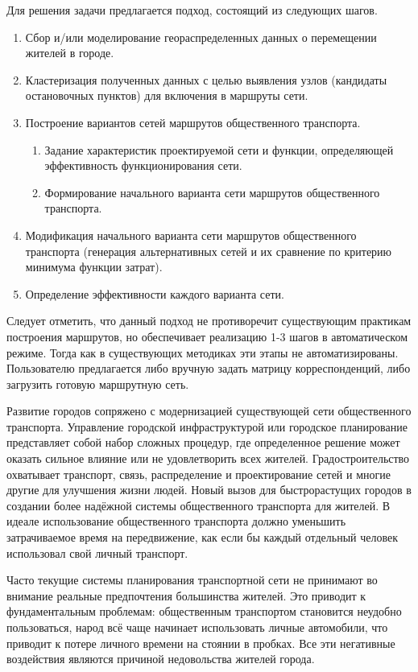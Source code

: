 Для решения задачи предлагается подход, состоящий из следующих шагов. 
\begin{enumerate}
    \item Сбор и/или моделирование геораспределенных данных о перемещении жителей в городе.
    \item Кластеризация полученных данных с целью выявления узлов (кандидаты остановочных пунктов) для 
        включения в маршруты сети.
    \item Построение вариантов сетей маршрутов общественного транспорта.
    \begin{enumerate}
        \item Задание характеристик проектируемой сети и функции, определяющей эффективность 
            функционирования сети.
        \item Формирование начального варианта сети маршрутов общественного транспорта.
    \end{enumerate}
    \item Модификация начального варианта сети маршрутов общественного транспорта (генерация 
        альтернативных сетей и их сравнение по критерию минимума функции затрат).
    \item Определение эффективности каждого варианта сети.
\end{enumerate}
Следует отметить, что данный подход не противоречит существующим практикам построения маршрутов, но 
обеспечивает реализацию 1-3 шагов в автоматическом режиме. Тогда как в существующих методиках \cite{bib:9} 
эти этапы не автоматизированы. Пользователю предлагается либо вручную задать матрицу корреспонденций, 
либо загрузить готовую маршрутную сеть.

Развитие городов сопряжено с модернизацией существующей сети общественного транспорта. Управление городской 
инфраструктурой или городское планирование представляет собой набор сложных процедур, где определенное 
решение может оказать сильное влияние или не удовлетворить всех жителей. Градостроительство охватывает 
транспорт, связь, распределение и проектирование сетей и многие другие для улучшения жизни людей. Новый 
вызов для быстрорастущих городов в создании более надёжной системы общественного транспорта для жителей. 
В идеале использование общественного транспорта должно уменьшить затрачиваемое время на передвижение, как 
если бы каждый отдельный человек использовал свой личный транспорт.

Часто текущие системы планирования транспортной сети не принимают во внимание реальные предпочтения 
большинства жителей. Это приводит к фундаментальным проблемам: общественным транспортом становится неудобно 
пользоваться, народ всё чаще начинает использовать личные автомобили, что приводит к потере личного времени 
на стоянии в пробках. Все эти негативные воздействия являются причиной недовольства жителей города.

